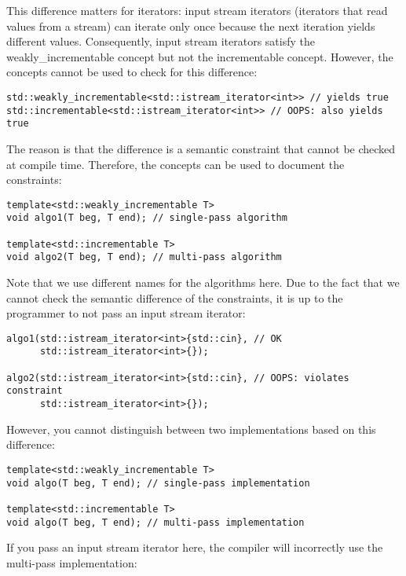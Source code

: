 This difference matters for iterators: input stream iterators (iterators that read values from a stream) can iterate only once because the next iteration yields different values. Consequently, input stream iterators satisfy the weakly\_incrementable concept but not the incrementable concept. However, the concepts cannot be used to check for this difference:

\begin{lstlisting}[style=styleCXX]
std::weakly_incrementable<std::istream_iterator<int>> // yields true
std::incrementable<std::istream_iterator<int>> // OOPS: also yields true
\end{lstlisting}

The reason is that the difference is a semantic constraint that cannot be checked at compile time. Therefore, the concepts can be used to document the constraints:

\begin{lstlisting}[style=styleCXX]
template<std::weakly_incrementable T>
void algo1(T beg, T end); // single-pass algorithm

template<std::incrementable T>
void algo2(T beg, T end); // multi-pass algorithm
\end{lstlisting}

Note that we use different names for the algorithms here. Due to the fact that we cannot check the semantic difference of the constraints, it is up to the programmer to not pass an input stream iterator:

\begin{lstlisting}[style=styleCXX]
algo1(std::istream_iterator<int>{std::cin}, // OK
	  std::istream_iterator<int>{});

algo2(std::istream_iterator<int>{std::cin}, // OOPS: violates constraint
	  std::istream_iterator<int>{});
\end{lstlisting}

However, you cannot distinguish between two implementations based on this difference:

\begin{lstlisting}[style=styleCXX]
template<std::weakly_incrementable T>
void algo(T beg, T end); // single-pass implementation

template<std::incrementable T>
void algo(T beg, T end); // multi-pass implementation
\end{lstlisting}

If you pass an input stream iterator here, the compiler will incorrectly use the multi-pass implementation:

